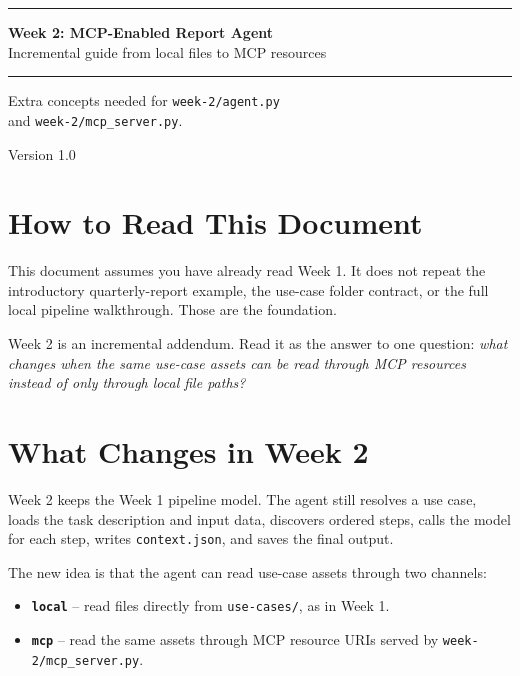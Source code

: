 \documentclass[12pt, a4paper]{article}
\begin{document}
\begin{titlepage}
  \centering
  \vspace*{3cm}
  {\color{primary}\rule{\linewidth}{2pt}}
  \vspace{1cm}

  {\Huge\bfseries\color{darktext} Week 2: MCP-Enabled Report Agent}\\[0.5em]
  {\Large\color{mutedtext} Incremental guide from local files to MCP resources}

  \vspace{1cm}
  {\color{primary}\rule{\linewidth}{2pt}}

  \vspace{2cm}
  {\large\color{mutedtext}
    Extra concepts needed for \texttt{week-2/agent.py}\\
    and \texttt{week-2/mcp\_server.py}.
  }

  \vfill
  {\small\color{mutedtext} Version 1.0}
\end{titlepage}

\tableofcontents
\newpage

\section{How to Read This Document}

This document assumes you have already read Week 1. It does not repeat the introductory quarterly-report example, the use-case folder contract, or the full local pipeline walkthrough. Those are the foundation.

Week 2 is an incremental addendum. Read it as the answer to one question: \textit{what changes when the same use-case assets can be read through MCP resources instead of only through local file paths?}

\section{What Changes in Week 2}

Week 2 keeps the Week 1 pipeline model. The agent still resolves a use case, loads the task description and input data, discovers ordered steps, calls the model for each step, writes \texttt{context.json}, and saves the final output.

The new idea is that the agent can read use-case assets through two channels:

\begin{itemize}[leftmargin=1.5em]
  \item \textbf{\texttt{local}} -- read files directly from \texttt{use-cases/}, as in Week 1.
  \item \textbf{\texttt{mcp}} -- read the same assets through MCP resource URIs served by \texttt{week-2/mcp\_server.py}.
\end{itemize}
\end{document}
